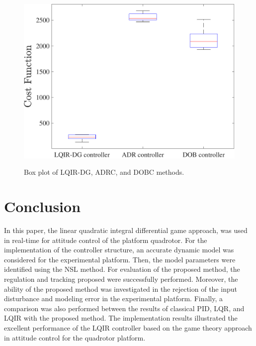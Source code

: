 \documentclass[3p]{elsarticle}
\begin{document}
\begin{figure}[H]
    \centering
    {\includegraphics[width=.55\linewidth]{../Figure/implementation/box_plot/lqidgvsboxplot_ADR}
    }
    \caption{Box plot of LQIR-DG, ADRC, and DOBC methods.}
    \label{fig:compare_boxplot_ADR}
\end{figure}


\newpage

\section{Conclusion}\label{sec:conclusion}
\vspace{-0.15cm}
\noindent In this paper, the linear quadratic integral differential game approach, was used in real-time for attitude control of the platform quadrotor. %
For the implementation of the controller structure, an accurate dynamic model was considered for the experimental platform.
Then, the model parameters were identified using the NSL method.
For evaluation of the proposed method, the regulation and tracking proposed were successfully performed.
Moreover, the ability of the proposed method was investigated in the rejection of the input disturbance and modeling error in the experimental platform.
Finally, a comparison
was also performed between the results of classical PID, LQR, and LQIR with the proposed method.
The implementation results illustrated the excellent performance of the LQIR controller based on the game theory approach in attitude control for the quadrotor platform.


\end{document}
